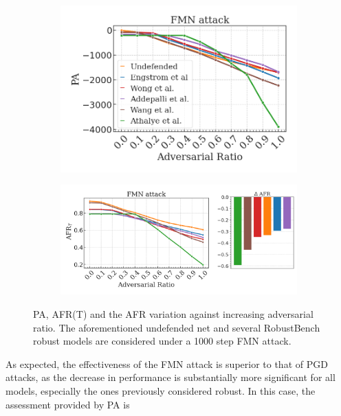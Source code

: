 \begin{figure}[H]
    \centering
    \begin{subfigure}[b]{0.39\textwidth}
        \centering
        \includegraphics[width=\textwidth]{img/results_discussion/adversarial/FMN_logPA.png}
    \end{subfigure}
    \hfill
    \begin{subfigure}[b]{0.59\textwidth}
        \centering
        \includegraphics[width=\textwidth]{img/results_discussion/adversarial/FMN_1000_AFR_true.png}
    \end{subfigure}
    \caption{PA, AFR(T) and the AFR variation against increasing adversarial ratio. 
    The aforementioned undefended net and several RobustBench robust models are considered 
    under a 1000 step FMN attack.}
    \label{fig:adv_fmn_pa_afr}
\end{figure}


As expected, the effectiveness of the FMN attack is superior to that of PGD attacks, as
the decrease in performance is substantially more significant for all models, especially the ones
previously considered robust. In this case, the assessment provided by PA is 

